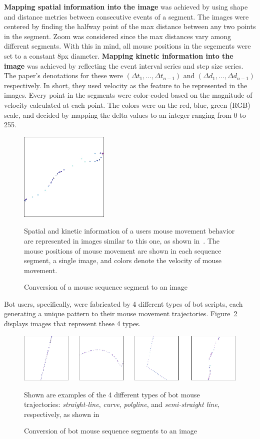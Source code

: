 \textbf{Mapping spatial information into the image} was achieved by using shape and distance metrics between consecutive events of a segment.
The images were centered by finding the halfway point of the max distance between any two points in the segment.
Zoom was considered since the max distances vary among different segments.
With this in mind, all mouse positions in the segements were set to a constant 8px diameter.
\textbf{Mapping kinetic information into the image} was achieved by reflecting the event interval series and step size series.
The paper's denotations for these were $({\Delta}t_1,\dots,{\Delta}t_{n-1})$ and $({\Delta}d_1,\dots,{\Delta}d_{n-1})$ respectively.
In short, they used velocity as the feature to be represented in the images.
Every point in the segments were color-coded based on the magnitude of velocity calculated at each point.
The colors were on the red, blue, green (RGB) scale, and decided by mapping the delta values to an integer ranging from 0 to 255.
\begin{figure}[!h]
    \centering
    \includegraphics[width=.35\columnwidth]{figures/deep_learning_with_mouse_dynamics_mouse_segment_image_generation}
    \caption{Conversion of a mouse sequence segment to an image}
    \label{fig:deep-learning-image-generation}
    {\small Spatial and kinetic information of a users mouse movement behavior are represented in images similar to this one, as shown in~\cite{deep_learning_detection_with_mouse_behavior}. The mouse positions of mouse movement are shown in each sequence segment, a single image, and colors denote the velocity of mouse movement.}
\end{figure}
Bot users, specifically, were fabricated by 4 different types of bot scripts, each generating a unique pattern to their mouse movement trajectories.
Figure~\ref{fig:deep-learning-image-generation-bots} displays images that represent these 4 types.
\begin{figure}[!h]
    \centering
    \includegraphics[width=1\columnwidth]{figures/deep_learning_with_mouse_dynamics_mouse_segment_image_generation_bots}
    \caption{Conversion of bot mouse sequence segments to an image}
    \label{fig:deep-learning-image-generation-bots}
    {\small Shown are examples of the 4 different types of bot mouse trajectories: \textit{straight-line}, \textit{curve}, \textit{polyline}, and \textit{semi-straight line}, respectively, as shown in~\cite{deep_learning_detection_with_mouse_behavior}}
\end{figure}
